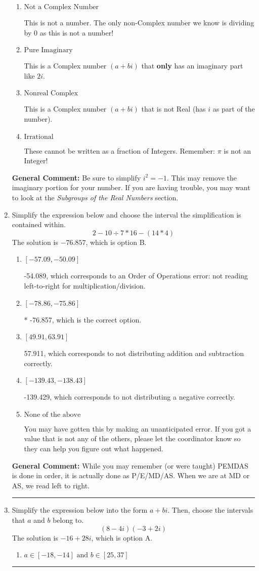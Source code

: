 \documentclass{extbook}[14pt]
\newcommand{\litem}[1]{\item #1

\rule{\textwidth}{0.4pt}}
\begin{document}
\begin{enumerate}
{\begin{enumerate}[label=\Alph*.]
* This is the correct option!
\item \( \text{Not a Complex Number} \)

This is not a number. The only non-Complex number we know is dividing by 0 as this is not a number!
\item \( \text{Pure Imaginary} \)

This is a Complex number $(a+bi)$ that \textbf{only} has an imaginary part like $2i$.
\item \( \text{Nonreal Complex} \)

This is a Complex number $(a+bi)$ that is not Real (has $i$ as part of the number).
\item \( \text{Irrational} \)

These cannot be written as a fraction of Integers. Remember: $\pi$ is not an Integer!
\end{enumerate}

\textbf{General Comment:} Be sure to simplify $i^2 = -1$. This may remove the imaginary portion for your number. If you are having trouble, you may want to look at the \textit{Subgroups of the Real Numbers} section.
}
\litem{
Simplify the expression below and choose the interval the simplification is contained within.
\[ 2 - 10 \div 7 * 16 - (14 * 4) \]The solution is \( -76.857 \), which is option B.\begin{enumerate}[label=\Alph*.]
\item \( [-57.09, -50.09] \)

 -54.089, which corresponds to an Order of Operations error: not reading left-to-right for multiplication/division.
\item \( [-78.86, -75.86] \)

* -76.857, which is the correct option.
\item \( [49.91, 63.91] \)

 57.911, which corresponds to not distributing addition and subtraction correctly.
\item \( [-139.43, -138.43] \)

 -139.429, which corresponds to not distributing a negative correctly.
\item \( \text{None of the above} \)

 You may have gotten this by making an unanticipated error. If you got a value that is not any of the others, please let the coordinator know so they can help you figure out what happened.
\end{enumerate}

\textbf{General Comment:} While you may remember (or were taught) PEMDAS is done in order, it is actually done as P/E/MD/AS. When we are at MD or AS, we read left to right.
}
\litem{
Simplify the expression below into the form $a+bi$. Then, choose the intervals that $a$ and $b$ belong to.
\[ (8 - 4 i)(-3 + 2 i) \]The solution is \( -16 + 28 i \), which is option A.\begin{enumerate}[label=\Alph*.]
\item \( a \in [-18, -14] \text{ and } b \in [25, 37] \)


\end{enumerate}}
\end{enumerate}
\end{document}
